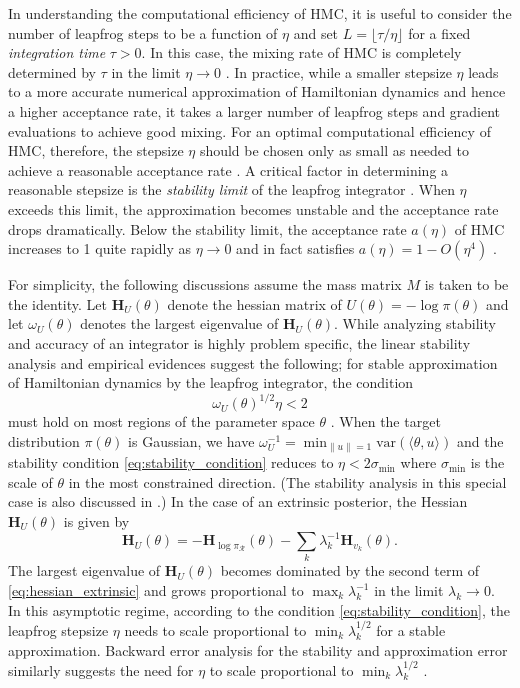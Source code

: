 \documentclass[10pt]{article}
\newcommand{\mc}[1]{\mathcal{#1}}
\DeclareMathOperator{\1}{\mathbbm{1}}
\newcommand{\dt}{\eta} %
\newcommand{\mass}{M} %
\newcommand{\hess}{\mathbf{H}} %
\begin{document}
In understanding the computational efficiency of HMC, it is useful to consider the number of leapfrog steps to be a function of $\dt$ and set $L = \lfloor \tau / \dt \rfloor$ for a fixed \textit{integration time} $\tau > 0$. In this case, the mixing rate of HMC is completely determined by $\tau$ in the limit $\dt \to 0$ \citep{betancourt17}. In practice, while a smaller stepsize $\dt$ leads to a more accurate numerical approximation of Hamiltonian dynamics and hence a higher acceptance rate, it takes a larger number of leapfrog steps and gradient evaluations to achieve good mixing. For an optimal computational efficiency of HMC, therefore, the stepsize $\dt$ should be chosen only as small as needed to achieve a reasonable acceptance rate \citep{beskos13, betancourt14}. A critical factor in determining a reasonable stepsize is the \textit{stability limit} of the leapfrog integrator \citep{neal2011mcmc}. When $\dt$ exceeds this limit, the approximation becomes unstable and the acceptance rate drops dramatically. Below the stability limit, the acceptance rate $a(\dt)$ of HMC increases to 1 quite rapidly as $\dt \to 0$ and in fact satisfies $a(\dt) = 1 - O(\dt^4)$ \citep{beskos13}.

For simplicity, the following discussions assume the mass matrix $\mass$ is taken to be the identity. Let $\hess_U(\theta)$ denote the hessian matrix of $U(\theta) = - \log \pi(\theta)$ and let $\omega_U(\theta)$ denotes the largest eigenvalue of $\hess_U(\theta)$. While analyzing stability and accuracy of an integrator is highly problem specific, the linear stability analysis and empirical evidences suggest the following; for stable approximation of Hamiltonian dynamics by the leapfrog integrator, the condition 
\begin{equation}
\label{eq:stability_condition}
\omega_U(\theta)^{1/2} \dt < 2
\end{equation} 
must hold on most regions of the parameter space $\theta$ \citep{hairer06}. When the target distribution $\pi(\theta)$ is Gaussian, we have $\omega_U^{-1} = \min_{\| u \| = 1} \textrm{var}(\langle \theta, u \rangle)$ and the stability condition \eqref{eq:stability_condition} reduces to $\eta < 2 \sigma_{\min}$ where $\sigma_{\min}$ is the scale of $\theta$ in the most constrained direction. (The stability analysis in this special case is also discussed in \cite{neal2011mcmc}.) In the case of an extrinsic posterior, the Hessian $\hess_U(\theta)$ is given by
\begin{equation}
\label{eq:hessian_extrinsic}
\hess_U(\theta) = -\hess_{\log \pi_{\mc R}}(\theta)  - \sum_k \lambda_k^{-1} \hess_{v_k}(\theta).
\end{equation}
The largest eigenvalue of $\hess_U(\theta)$ becomes dominated by the second term of \eqref{eq:hessian_extrinsic} and grows proportional to $\max_k \lambda_k^{-1}$ in the limit $\lambda_k \to 0$. In this asymptotic regime, according to the condition \eqref{eq:stability_condition}, the leapfrog stepsize $\dt$ needs to scale proportional to $\min_k \lambda_k^{1/2}$ for a stable approximation. Backward error analysis for the stability and approximation error similarly suggests the need for $\dt$ to scale proportional to $\min_k \lambda_k^{1/2}$ \citep{skeel2001modified}.
\end{document}
